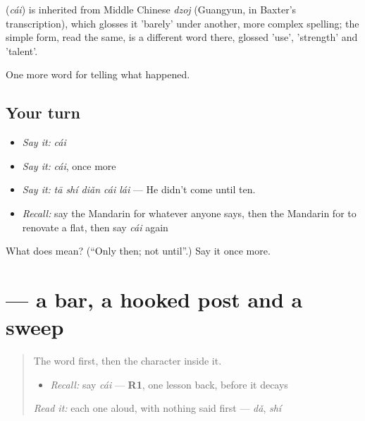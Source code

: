 \begin{cousinweb}
\textbf{} (\emph{cái}) is inherited from Middle Chinese \emph{dzoj} (Guangyun, in Baxter's transcription), which glosses it 'barely' under another, more complex spelling; the simple form, read the same, is a different word there, glossed 'use', 'strength' and 'talent'.
\end{cousinweb}

\begin{grammarlens}[title={What you've built}]
One more word for telling what happened.
\end{grammarlens}

\subsection*{Your turn}
\begin{itemize}
\raggedright
  \item \emph{Say it:} \emph{cái}
  \item \emph{Say it:} \emph{cái}, once more
  \item \emph{Say it:} \emph{tā shí diǎn cái lái} — He didn't come until ten.
  \item \emph{Recall:} say the Mandarin for whatever anyone says, then the Mandarin for to renovate a flat, then say \emph{cái} again
\end{itemize}

\begin{tcolorbox}[breakable,colback=teal!4,colframe=teal!35!black,title={Before you move on}]
What does  mean? (\textquotedblleft{}Only then; not until\textquotedblright{}.) Say it once more.
\end{tcolorbox}
\section[\texorpdfstring{\zh{才} (cái)}{才 (cái)}]{ — a bar, a hooked post and a sweep}

\label{lesson:ZH-W313-cai-only}



\begin{quote}
The word first, then the character inside it.

\begin{itemize}
\raggedright
  \item \emph{Recall:} say \emph{cái} — \textbf{R1}, one lesson back, before it decays
\end{itemize}

\begin{quote}
 
\end{quote}

\emph{Read it:} each one aloud, with nothing said first — \emph{dǎ}, \emph{shí}
\end{quote}

